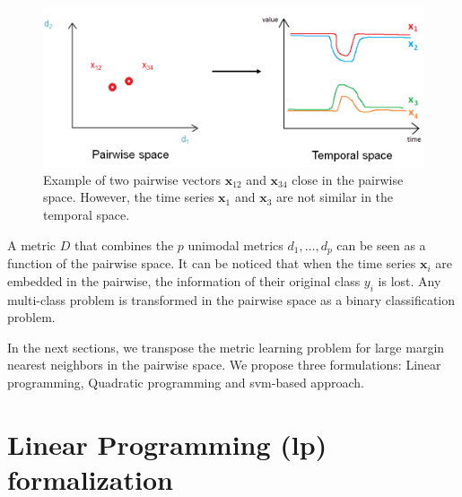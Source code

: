 \begin{figure}[h!]
\centering
\includegraphics[width=1\linewidth]{images/ContreExample}
\caption{Example of two pairwise vectors $\textbf{x}_{12}$ and $\textbf{x}_{34}$ close in the pairwise space. However, the time series $\textbf{x}_{1}$ and $\textbf{x}_{3}$ are not similar in the temporal space.}
\label{fig:ContreExample}
\end{figure}

A metric $D$ that combines the $p$ unimodal metrics $d_1, \ldots, d_p$ can be seen as a function of the pairwise space. It can be noticed that when the time series $\textbf{x}_i$ are embedded in the pairwise, the information of their original class $y_i$ is lost. Any multi-class problem is transformed in the pairwise space as a binary classification problem.

In the next sections, we transpose the metric learning problem for large margin nearest neighbors in the pairwise space. We propose three formulations: Linear programming, Quadratic programming and {\sc svm}-based approach.


\section{Linear Programming ({\sc lp}) formalization}


